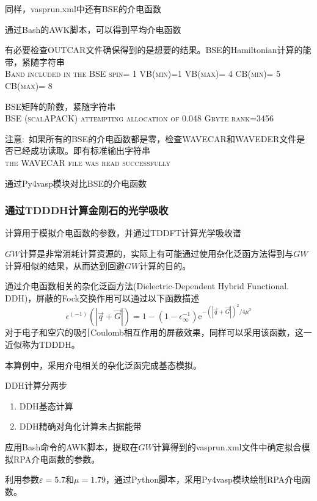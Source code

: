 同样，\textrm{vasprun.xml}中还有\textrm{BSE}的介电函数

通过\textrm{Bash}的\textrm{AWK}脚本，可以得到平均介电函数

有必要检查\textrm{OUTCAR}文件确保得到的是想要的结果。\textrm{BSE}的\textrm{Hamiltonian}计算的能带，紧随字符串\\
\textsc{Band included in the BSE spin= 1 VB(min)=1 VB(max)= 4 CB(min)= 5 CB(max)= 8}

\textrm{BSE}矩阵的阶数，紧随字符串\\
\textsc{BSE (scalAPACK) attempting allocation of 0.048 Gbyte rank=3456}

注意:~如果所有的\textrm{BSE}的介电函数都是零，检查\textrm{WAVECAR}和\textrm{WAVEDER}文件是否已经成功读取。即有标准输出字符串\\
\textsc{the WAVECAR file was read successfully}

通过\textrm{Py4vasp}模块对比\textrm{BSE}的介电函数

\subsubsection{通过\rm{TDDDH}计算金刚石的光学吸收}
计算用于模拟介电函数的参数，并通过\textrm{TDDFT}计算光学吸收谱

$GW$计算是非常消耗计算资源的，实际上有可能通过使用杂化泛函方法得到与$GW$计算相似的结果，从而达到回避$GW$计算的目的。

通过介电函数相关的杂化泛函方法\textrm{(Dielectric-Dependent Hybrid Functional. DDH)}，屏蔽的\textrm{Fock}交换作用可以通过以下函数描述
\begin{displaymath}
	\epsilon^{(-1)}(|\vec q+\vec G|)=1-(1-\epsilon_{\infty}^{-1})\mathrm{e}^{-(|\vec q+\vec G|)^2/4\mu^2}
\end{displaymath}
对于电子和空穴的吸引\textrm{Coulomb}相互作用的屏蔽效果，同样可以采用该函数，这一近似称为\textrm{TDDDH}。

本算例中，采用介电相关的杂化泛函完成基态模拟。

\textrm{DDH}计算分两步
\begin{enumerate}
	\item \textrm{DDH}基态计算
	\item \textrm{DDH}精确对角化计算未占据能带
\end{enumerate}

应用\textrm{Bash}命令的\textrm{AWK}脚本，提取在$GW$计算得到的\textrm{vasprun.xml}文件中确定拟合模拟\textrm{RPA}介电函数的参数。

利用参数$\varepsilon=5.7$和$\mu=1.79$，通过\textrm{Python}脚本，采用\textrm{Py4vasp}模块绘制\textrm{RPA}介电函数。

